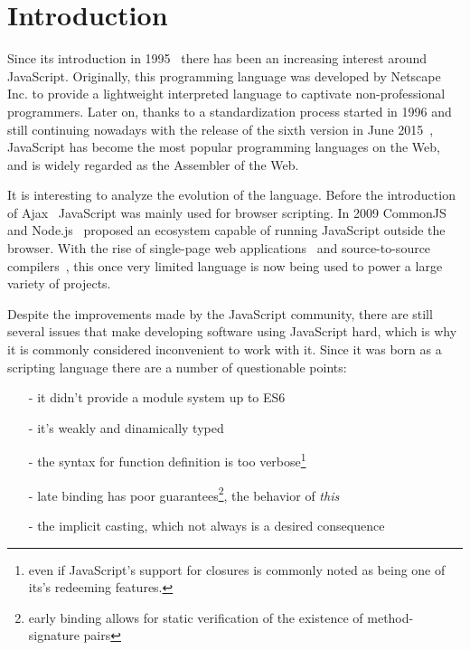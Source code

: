 \documentclass{sig-alternate}
\begin{document}



\section{Introduction}
Since its introduction in 1995~\cite{web:js} there has been an increasing interest around JavaScript. Originally, this programming language was developed by Netscape Inc. to provide a lightweight interpreted language to captivate non-professional programmers. Later on, thanks to a standardization process started in 1996 and still continuing nowadays with the release of the sixth version in June 2015~\cite{web:ecmascript6}, JavaScript has become the most popular programming languages on the Web, and is widely regarded as the Assembler of the Web.

It is interesting to analyze the evolution of the language. Before the introduction of Ajax~\cite{web:ajax} JavaScript was mainly used for browser scripting. In 2009 CommonJS~\cite{web:commonjs} and Node.js~\cite{web:nodejs} proposed an ecosystem capable of running JavaScript outside the browser. With the rise of single-page web applications~\cite{web:spa} and source-to-source compilers~\cite{web:compile2js}, this once very limited language is now being used to power a large variety of projects.

Despite the improvements made by the JavaScript community, there are still several issues that make developing software using JavaScript hard, which is why it is commonly considered inconvenient to work with it. Since it was born as a scripting language there are a number of questionable points:

\begin{itemize}
	\item[-] it didn't provide a module system up to ES6~\cite{web:es6modules}
	\item[-] it's weakly and dinamically typed
	\item[-] the syntax for function definition is too verbose\footnote{even if JavaScript's support for closures is commonly noted as being one of its\rq{s} redeeming features.}
	\item[-] late binding has poor guarantees\footnote{early binding allows for static verification of the existence of method-signature pairs}, the behavior of \emph{this}
	\item[-] the implicit casting, which not always is a desired consequence
\end{itemize}
\end{document}
